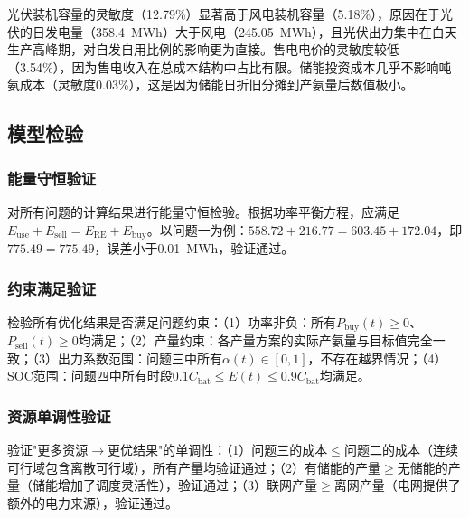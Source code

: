 光伏装机容量的灵敏度（12.79\%）显著高于风电装机容量（5.18\%），原因在于光伏的日发电量（358.4~MWh）大于风电（245.05~MWh），且光伏出力集中在白天生产高峰期，对自发自用比例的影响更为直接。售电电价的灵敏度较低（3.54\%），因为售电收入在总成本结构中占比有限。储能投资成本几乎不影响吨氨成本（灵敏度0.03\%），这是因为储能日折旧分摊到产氨量后数值极小。

\subsection{模型检验}

\subsubsection{能量守恒验证}

对所有问题的计算结果进行能量守恒检验。根据功率平衡方程，应满足$E_{\text{use}} + E_{\text{sell}} = E_{\text{RE}} + E_{\text{buy}}$。以问题一为例：$558.72 + 216.77 = 603.45 + 172.04$，即$775.49 = 775.49$，误差小于0.01~MWh，验证通过。

\subsubsection{约束满足验证}

检验所有优化结果是否满足问题约束：（1）功率非负：所有$P_{\text{buy}}(t) \geq 0$、$P_{\text{sell}}(t) \geq 0$均满足；（2）产量约束：各产量方案的实际产氨量与目标值完全一致；（3）出力系数范围：问题三中所有$\alpha(t) \in [0, 1]$，不存在越界情况；（4）SOC范围：问题四中所有时段$0.1 C_{\text{bat}} \leq E(t) \leq 0.9 C_{\text{bat}}$均满足。

\subsubsection{资源单调性验证}

验证"更多资源$\to$更优结果"的单调性：（1）问题三的成本$\leq$问题二的成本（连续可行域包含离散可行域），所有产量均验证通过；（2）有储能的产量$\geq$无储能的产量（储能增加了调度灵活性），验证通过；（3）联网产量$\geq$离网产量（电网提供了额外的电力来源），验证通过。
